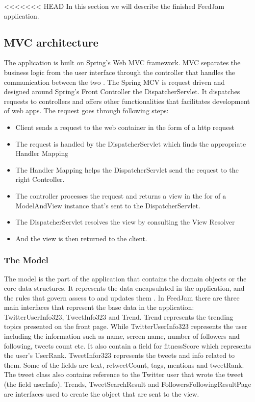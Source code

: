 <<<<<<< HEAD
In this section we will describe the finished FeedJam application.

\subsection{MVC architecture} %
\label{sec:MVC}
The application is built on Spring's Web MVC framework. MVC separates the business logic from the user interface through the controller that handles the communication between the two \citep{Oracle}. The Spring MCV is request driven and designed around Spring's Front Controller the DispatcherServlet. It dispatches requests to controllers and offers other functionalities that facilitates development of web apps. The request goes through following steps:

\begin{itemize}
\item Client sends a request to the web container in the form of a http request
\item The request is handled by the DispatcherServlet which finds the appropriate Handler Mapping
\item The Handler Mapping helps the DispatcherServlet send the request to the right Controller. 
\item The controller processes the request and returns a view in the for of a ModelAndView instance that's sent to the DispatcherServlet. 
\item The DispatcherServlet resolves the view by consulting the View Resolver
\item And the view is then returned to the client. 
\end{itemize}




\subsubsection{The Model} %
The model is the part of the application that contains the domain objects or the core data structures. It represents the data encapsulated in the application, and the rules that govern assess to and updates them \citep{Oracle}. In FeedJam there are three main interfaces  that represent the base data in the application: TwitterUserInfo323, TweetInfo323 and Trend. Trend represents the trending topics presented on the front page. While TwitterUserInfo323 represents the user including the information such as name, screen name, number of followers and following, tweets count etc. It also contain a field for fitnessScore which represents the user's UserRank. TweetInfor323 represents the tweets and info related to them. Some of the fields are text, retweetCount, tags, mentions and tweetRank. The tweet class also contains reference to the Twitter user that wrote the tweet (the field userInfo). Trends, TweetSearchResult and FollowersFollowingResultPage are interfaces used to create the object that are sent to the view. 

